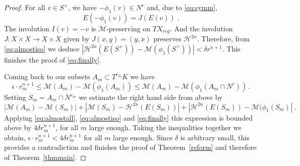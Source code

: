 \documentclass[12pt,leqno]{amsart}
\numberwithin{equation}{section}
\newtheorem{lem}[thm]{Lemma}
\theoremstyle{definition}
\theoremstyle{remark}
\newcommand{\tref}[1]{Theorem~\ref{#1}}
\newcommand{\vol}{\mathrm{vol}}
\def\:{\colon}
\begin{document}
\begin{proof}
For all $v\in S^+$, we have $-\phi _1 (v) \in N^r$ and,   due to \eqref{eq:symm},
$$E(-\phi_1 (v)) =J(E(v)) \;.$$
The involution  $I(v)=-v$ is $\mathcal M$-preserving on $TX_{reg}$.  And the involution
 $J\:X\times X\to X\times X$ given by $J(x,y)=(y,x)$ preserves $\mathcal H^{2n}$. Therefore, from \eqref{eq:almostiso} we deduce
 $|\mathcal H^{2n} (E(S^+)) - \mathcal M (\phi _1 (S^+))|  <   \delta r^{n+1} $.
  This finishes the proof of \eqref{eq:finally}.


Coming back to our subsets $A_m\subset T^{r_m} K$ we have
 $$\epsilon \cdot r_m^ {n+1} \leq \mathcal M ( A_m) - \mathcal M( \phi _1 (A_m)) \leq \mathcal M ( A_m) - \mathcal M( \phi _1 (A_m\cap N^r)) \,.$$
Setting  $S_m=A_m\cap N^{r_m}$ we estimate the right hand side from above by
$$|\mathcal M (A_m) -  \mathcal M(S_m)|
+|\mathcal M (S_m )  - \mathcal H^{2n} (E(S_m) )| + | \mathcal H ^{2n} (E(S_m)) - \mathcal M (\phi _1(S_m)|  \;.$$
Applying  \eqref{eq:almostall}, \eqref{eq:almostiso} and \eqref{eq:finally}  this expression is bounded above by $4 \delta r _m^{n+1}$, for all $m$ large enough. Taking the inequalities together we obtain,  $\epsilon \cdot r_m^ {n+1}< 4 \delta r _m^{n+1}$ for all $m$ large enough.
Since $\delta$ is arbitrary small, this provides a  contradiction  and  finishes the proof of \tref{reform} and therefore of \tref{thmmain}.
\end{proof}












\end{document}
